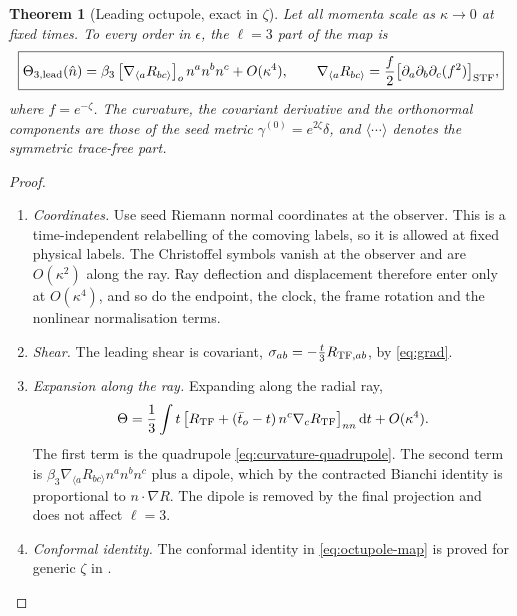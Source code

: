\documentclass[11pt]{article}
\newtheorem{theorem}{Theorem}
\theoremstyle{definition}
\theoremstyle{remark}
\newcommand{\eps}{\epsilon}
\newcommand{\nh}{\hat n}
\newcommand{\dd}{\mathrm{d}}
\begin{document}
\begin{theorem}[Leading octupole, exact in $\zeta$]\label{thm:octupole}
Let all momenta scale as $\kappa\to0$ at fixed times. To every order in $\eps$, the
$\ell=3$ part of the map is
\begin{equation}\label{eq:octupole-map}
\boxed{\displaystyle
\Theta_{3,\mathrm{lead}}(\nh)=\beta_3\,\big[\nabla_{\langle a}R_{bc\rangle}\big]_o\,n^an^bn^c
+O(\kappa^4),\qquad
\nabla_{\langle a}R_{bc\rangle}=\frac f2\big[\partial_a\partial_b\partial_c(f^2)\big]_{\rm STF},}
\end{equation}
where $f=e^{-\zeta}$. The curvature, the covariant derivative and the orthonormal components
are those of the seed metric $\gamma^{(0)}=e^{2\zeta}\delta$, and $\langle\cdots\rangle$
denotes the symmetric trace-free part.
\end{theorem}
\begin{proof}
\begin{enumerate}
\item \emph{Coordinates.} Use seed Riemann normal coordinates at the observer. This is a
  time-independent relabelling of the comoving labels, so it is allowed at fixed physical
  labels. The Christoffel symbols vanish at the observer and are $O(\kappa^2)$ along the ray.
  Ray deflection and displacement therefore enter only at $O(\kappa^4)$, and so do the
  endpoint, the clock, the frame rotation and the nonlinear normalisation terms.
\item \emph{Shear.} The leading shear is covariant, $\sigma_{ab}=-\frac t3R_{{\rm TF},ab}$,
  by \eqref{eq:grad}.
\item \emph{Expansion along the ray.} Expanding along the radial ray,
  \[\Theta=\frac13\int t\,\big[R_{\rm TF}+(\bar t_o-t)\,n^c\nabla_cR_{\rm TF}\big]_{nn}\,\dd t+O(\kappa^4).\]
  The first term is the quadrupole \eqref{eq:curvature-quadrupole}. The second term is
  $\beta_3\nabla_{\langle a}R_{bc\rangle}n^an^bn^c$ plus a dipole, which by the contracted
  Bianchi identity is proportional to $n\cdot\nabla R$. The dipole is removed by the final
  projection and does not affect $\ell=3$.
\item \emph{Conformal identity.} The conformal identity in \eqref{eq:octupole-map} is
  proved for generic $\zeta$ in .
\end{enumerate}
\end{proof}
\end{document}
